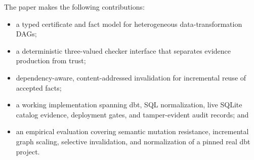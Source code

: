 The paper makes the following contributions:
\begin{itemize}
  \item a typed certificate and fact model for heterogeneous data-transformation DAGs;
  \item a deterministic three-valued checker interface that separates evidence production from trust;
  \item dependency-aware, content-addressed invalidation for incremental reuse of accepted facts;
  \item a working implementation spanning dbt, SQL normalization, live SQLite catalog evidence, deployment gates, and tamper-evident audit records; and
  \item an empirical evaluation covering semantic mutation resistance, incremental graph scaling, selective invalidation, and normalization of a pinned real dbt project.
\end{itemize}
